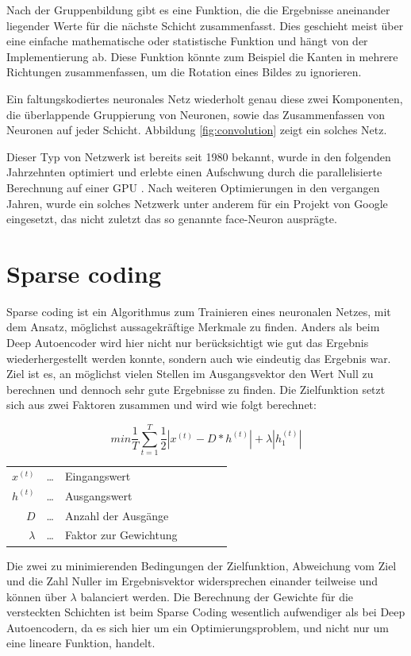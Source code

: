 Nach der Gruppenbildung gibt es eine Funktion, die die Ergebnisse aneinander liegender Werte für die nächste Schicht zusammenfasst. Dies geschieht meist über eine einfache mathematische oder statistische Funktion und hängt von der Implementierung ab. Diese Funktion könnte zum Beispiel die Kanten in mehrere Richtungen zusammenfassen, um die Rotation eines Bildes zu ignorieren.

Ein faltungskodiertes neuronales Netz wiederholt genau diese zwei Komponenten, die überlappende Gruppierung von Neuronen, sowie das Zusammenfassen von Neuronen auf jeder Schicht. Abbildung \ref{fig:convolution} zeigt ein solches Netz.

Dieser Typ von Netzwerk ist bereits seit 1980 \citep{convolutional} bekannt, wurde in den folgenden Jahrzehnten optimiert und erlebte einen Aufschwung durch die parallelisierte Berechnung auf einer GPU \citep{dandan}. Nach weiteren Optimierungen in den vergangen Jahren, wurde ein solches Netzwerk unter anderem für ein Projekt von Google \citep{googleimage} eingesetzt, das nicht zuletzt das so genannte face-Neuron ausprägte.

\section{Sparse coding}

Sparse coding ist ein Algorithmus zum Trainieren eines neuronalen Netzes, mit dem Ansatz, möglichst aussagekräftige Merkmale zu finden. Anders als beim Deep Autoencoder wird hier nicht nur berücksichtigt wie gut das Ergebnis wiederhergestellt werden konnte, sondern auch wie eindeutig das Ergebnis war. Ziel ist es, an möglichst vielen Stellen im Ausgangsvektor den Wert Null zu berechnen und dennoch sehr gute Ergebnisse zu finden. Die Zielfunktion setzt sich aus zwei Faktoren zusammen und wird wie folgt berechnet:

$$min\frac{1}{T}\sum_{t=1}^{T}\frac{1}{2}|x^{(t)}-D*h^{(t)}|+\lambda|h^{(t)}_1|$$
\begin{center}\begin{tabular}{rclcrcl}
	$x^{(t)}$ & \dots & Eingangswert\\
	$h^{(t)}$ & \dots & Ausgangswert\\
	$D$ & \dots & Anzahl der Ausgänge\\
	$\lambda$ & \dots & Faktor zur Gewichtung\\ 
\end{tabular}\end{center}

Die zwei zu minimierenden Bedingungen der Zielfunktion, Abweichung vom Ziel und die Zahl Nuller im Ergebnisvektor widersprechen einander teilweise und können über $\lambda$ balanciert werden. Die Berechnung der Gewichte für die versteckten Schichten ist beim Sparse Coding wesentlich aufwendiger als bei Deep Autoencodern, da es sich hier um ein Optimierungsproblem, und nicht nur um eine lineare Funktion, handelt.